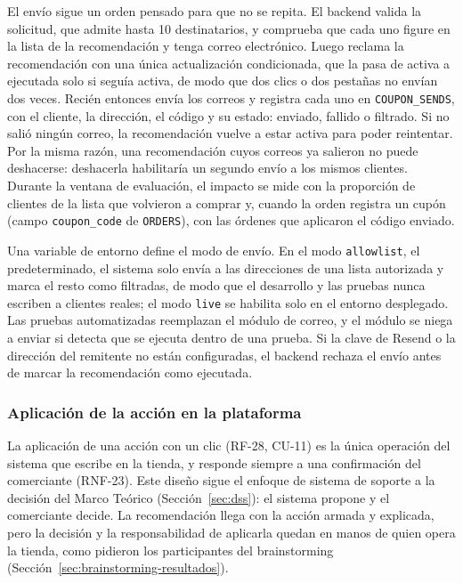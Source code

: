 El envío sigue un orden pensado para que no se repita. El backend valida la solicitud, que admite hasta 10 destinatarios, y comprueba que cada uno figure en la lista de la recomendación y tenga correo electrónico. Luego reclama la recomendación con una única actualización condicionada, que la pasa de activa a ejecutada solo si seguía activa, de modo que dos clics o dos pestañas no envían dos veces. Recién entonces envía los correos y registra cada uno en \texttt{COUPON\_SENDS}, con el cliente, la dirección, el código y su estado: enviado, fallido o filtrado. Si no salió ningún correo, la recomendación vuelve a estar activa para poder reintentar. Por la misma razón, una recomendación cuyos correos ya salieron no puede deshacerse: deshacerla habilitaría un segundo envío a los mismos clientes.
Durante la ventana de evaluación, el impacto se mide con la proporción de clientes de la lista que volvieron a comprar y, cuando la orden registra un cupón (campo \texttt{coupon\_code} de \texttt{ORDERS}), con las órdenes que aplicaron el código enviado.

Una variable de entorno define el modo de envío. En el modo \texttt{allowlist}, el predeterminado, el sistema solo envía a las direcciones de una lista autorizada y marca el resto como filtradas, de modo que el desarrollo y las pruebas nunca escriben a clientes reales; el modo \texttt{live} se habilita solo en el entorno desplegado. Las pruebas automatizadas reemplazan el módulo de correo, y el módulo se niega a enviar si detecta que se ejecuta dentro de una prueba. Si la clave de Resend o la dirección del remitente no están configuradas, el backend rechaza el envío antes de marcar la recomendación como ejecutada.

\subsubsection{Aplicación de la acción en la plataforma}
\label{sec:aplicacion-accion}

La aplicación de una acción con un clic (RF-28, CU-11) es la única operación del sistema que escribe en la tienda, y responde siempre a una confirmación del comerciante (RNF-23). Este diseño sigue el enfoque de sistema de soporte a la decisión del Marco Teórico (Sección~\ref{sec:dss}): el sistema propone y el comerciante decide. La recomendación llega con la acción armada y explicada, pero la decisión y la responsabilidad de aplicarla quedan en manos de quien opera la tienda, como pidieron los participantes del brainstorming (Sección~\ref{sec:brainstorming-resultados}).

